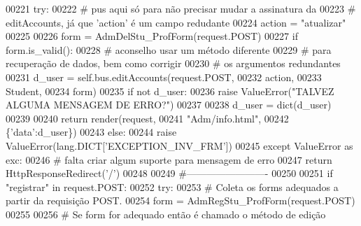 \begin{DoxyCode}
00221                 \textcolor{keywordflow}{try}:
00222                     \textcolor{comment}{# pus aqui só para não precisar mudar a assinatura da}
00223                     \textcolor{comment}{# editAccounts, já que 'action' é um campo redudante}
00224                     action = \textcolor{stringliteral}{"atualizar"}
00225 
00226                     form = AdmDelStu\_ProfForm(request.POST)
00227                     \textcolor{keywordflow}{if} form.is\_valid():
00228                         \textcolor{comment}{# aconselho usar um método diferente}
00229                         \textcolor{comment}{# para recuperação de dados, bem como corrigir}
00230                         \textcolor{comment}{# os argumentos redundantes}
00231                         d\_user = self.bus.editAccounts(request.POST,
00232                                                         action,
00233                                                         Student,
00234                                                         form)
00235                         \textcolor{keywordflow}{if} \textcolor{keywordflow}{not} d\_user:
00236                             \textcolor{keywordflow}{raise} ValueError(\textcolor{stringliteral}{"TALVEZ ALGUMA MENSAGEM DE ERRO?"})
00237 
00238                         d\_user = dict(d\_user)
00239 
00240                         \textcolor{keywordflow}{return} render(request, 
00241                                       \textcolor{stringliteral}{"Adm/info.html"}, 
00242                                       \{\textcolor{stringliteral}{'data'}:d\_user\})
00243                     \textcolor{keywordflow}{else}:
00244                         \textcolor{keywordflow}{raise} ValueError(lang.DICT[\textcolor{stringliteral}{'EXCEPTION\_INV\_FRM'}])
00245                 \textcolor{keywordflow}{except} ValueError \textcolor{keyword}{as} exc:
00246                     \textcolor{comment}{# falta criar algum suporte para mensagem de erro}
00247                     \textcolor{keywordflow}{return} HttpResponseRedirect(\textcolor{stringliteral}{'/'})
00248 
00249             \textcolor{comment}{#-------------------------}
00250 
00251             \textcolor{keywordflow}{if} \textcolor{stringliteral}{"registrar"} \textcolor{keywordflow}{in} request.POST:
00252                 \textcolor{keywordflow}{try}:
00253                     \textcolor{comment}{# Coleta os forms adequados a partir da requisição POST.}
00254                     form = AdmRegStu\_ProfForm(request.POST)
00255 
00256                     \textcolor{comment}{# Se form for adequado então é chamado o método de edição }

\end{DoxyCode}
